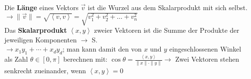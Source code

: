 Die \textbf{Länge} eines Vektors \(\vec{v}\) ist die Wurzel aus dem Skalarprodukt mit sich selbst.\\
\(\rightarrow \|\vec{v}\| = \sqrt{\left\langle v, v\right\rangle} = \sqrt{v_1^2 + v_2^2 + \dots + v_n^2}\)\\

Das \textbf{Skalarprodukt} \(\left\langle x, y\right\rangle \) zweier Vektoren ist die Summe der Produkte der jeweiligen Komponenten \(\rightarrow\) S.~\pageref{skalarprodukt}\\
\(\rightarrow x_1y_1+\cdots + x_dy_d\); man kann damit den von \(x\) und \(y\) eingeschlossenen Winkel als Zahl \(\theta \in [0,\pi]\) berechnen mit: \(\cos \theta = \frac{\left\langle x, y\right\rangle}{\|x\|\cdot \|y\|} \rightarrow\) Zwei Vektoren stehen senkrecht zueinander, wenn \(\left\langle x, y\right\rangle = 0\)\\